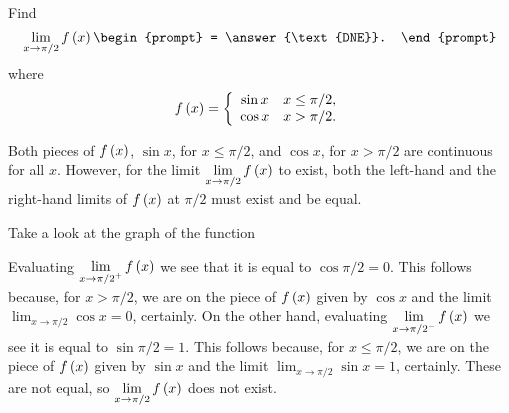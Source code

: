 \documentclass{ximera}
\author{Gregory Hartman \and Matthew Carr}
\begin{document}
\begin{exercise}



  Find 
  \[
  \lim_{x\to \pi/2} f\p{x}
  \begin{prompt}
  = \answer{\text{DNE}}.
  \end{prompt}
  \]
  where
  \[
  f\left(x\right) = \left\{\begin{array}{cl} \sin x & x\leq \pi/2, \\ \cos x & x>\pi/2. \end{array}\right.
  \]
    \begin{hint}
     Both pieces of $f\left(x\right)$, $\sin x$, for $x\leq\pi/2$, and $\cos x$, for $x>\pi/2$ are continuous for all $x$. However, for the limit $\lim_{x\to\pi/2}f\p{x}$ to exist, both the left-hand and the right-hand limits of $f\left(x\right)$ at $\pi/2$ must exist and be equal.
    \end{hint}
     \begin{hint}
    	Take a look at the graph of the function
    \begin{center}
      \end{center} 
    \end{hint}
    \begin{hint}
     Evaluating $\lim_{x\to{\pi/2}^{+}}f\p{x}$ we see that it is equal to $\cos \pi/2=0$. This follows because, for $x>\pi/2$, we are on the piece of $f\left(x\right)$ given by $\cos x$ and the limit $\lim_{x\to{\pi/2}}\cos x=0$, certainly. On the other hand, evaluating $\lim_{x\to{\pi/2}^{-}}f\p{x}$ we see it is equal to $\sin \pi/2=1$. This follows because, for $x\leq\pi/2$, we are on the piece of $f\left(x\right)$ given by $\sin x$ and the limit $\lim_{x\to\pi/2}\sin x=1$, certainly. These are not equal, so $\lim_{x\to\pi/2}f\p{x}$ does not exist.
    \end{hint}
\end{exercise}
\end{document}
